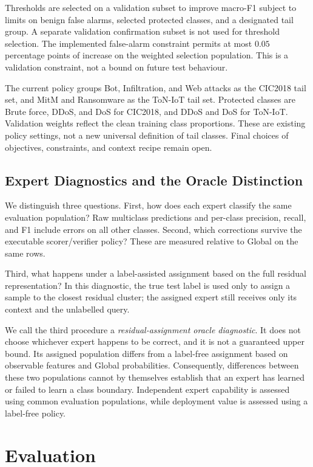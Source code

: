 \documentclass[sigconf,anonymous,pbalance]{acmart}
\begin{document}
Thresholds are selected on a validation subset to improve macro-F1 subject to limits on benign false alarms, selected protected classes, and a designated tail group. A separate validation confirmation subset is not used for threshold selection. The implemented false-alarm constraint permits at most $0.05$ percentage points of increase on the weighted selection population. This is a validation constraint, not a bound on future test behaviour. 

The current policy groups Bot, Infiltration, and Web attacks as the CIC2018 tail set, and MitM and Ransomware as the ToN-IoT tail set. Protected classes are Brute force, DDoS, and DoS for CIC2018, and DDoS and DoS for ToN-IoT. Validation weights reflect the clean training class proportions. These are existing policy settings, not a new universal definition of tail classes. Final choices of objectives, constraints, and context recipe remain open.

\subsection{Expert Diagnostics and the Oracle Distinction}
\label{sec:diagnostics}
We distinguish three questions. First, how does each expert classify the same evaluation population? Raw multiclass predictions and per-class precision, recall, and F1 include errors on all other classes. Second, which corrections survive the executable scorer/verifier policy? These are measured relative to Global on the same rows. 

Third, what happens under a label-assisted assignment based on the full residual representation? In this diagnostic, the true test label is used only to assign a sample to the closest residual cluster; the assigned expert still receives only its context and the unlabelled query.

We call the third procedure a \emph{residual-assignment oracle diagnostic}. It does not choose whichever expert happens to be correct, and it is not a guaranteed upper bound. Its assigned population differs from a label-free assignment based on observable features and Global probabilities. Consequently, differences between these two populations cannot by themselves establish that an expert has learned or failed to learn a class boundary. Independent expert capability is assessed using common evaluation populations, while deployment value is assessed using a label-free policy.

\section{Evaluation}
\label{sec:eval}
\end{document}

